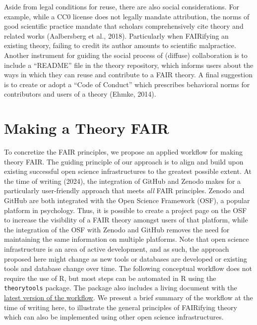 \documentclass[
  man, noextraspace,floatsintext]{apa6}
\begin{document}
Aside from legal conditions for reuse, there are also social considerations.
For example, while a CC0 license does not legally mandate attribution,
the norms of good scientific practice mandate that scholars comprehensively cite theory and related works (Aalbersberg et al., 2018).
Particularly when FAIRifying an existing theory, failing to credit its author amounts to scientific malpractice.
Another instrument for guiding the social process of (diffuse) collaboration is to include a ``README'' file in the theory repository, which informs users about the ways in which they can reuse and contribute to a FAIR theory.
A final suggestion is to create or adopt a ``Code of Conduct'' which prescribes behavioral norms for contributors and users of a theory (Ehmke, 2014).

\section{Making a Theory FAIR}\label{making-a-theory-fair}

To concretize the FAIR principles,
we propose an applied workflow for making theory FAIR.
The guiding principle of our approach is to align and build upon existing successful open science infrastructures to the greatest possible extent.
At the time of writing (2024),
the integration of GitHub and Zenodo makes for a particularly user-friendly approach that meets \emph{all} FAIR principles.
Zenodo and GitHub are both integrated with the Open Science Framework (OSF),
a popular platform in psychology.
Thus, it is possible to create a project page on the OSF to increase the visibility of a FAIR theory amongst users of that platform,
while the integration of the OSF with Zenodo and GitHub removes the need for maintaining the same information on multiple platforms.
Note that open science infrastructure is an area of active development, and as such,
the approach proposed here might change as new tools or databases are developed or existing tools and database change over time.
The following conceptual workflow does not require the use of R, but most steps can be automated in R using the \texttt{theorytools} package.
The package also includes a living document with the \href{https://cjvanlissa.github.io/theorytools/articles/fair-theory.html}{latest version of the workflow}.
We present a brief summary of the workflow at the time of writing here,
to illustrate the general principles of FAIRifying theory which can also be implemented using other open science infrastructures.
\end{document}
